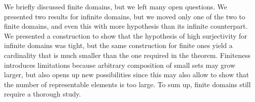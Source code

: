 We briefly discussed finite domains, but we left many open questions. We presented two results for infinite domains, but we moved only one of the two to finite domains, and even this with more hypothesis than its infinite counterpart. We presented a construction to show that the hypothesis of high surjectivity for infinite domains was tight, but the same construction for finite ones yield a cardinality that is much smaller than the one required in the theorem. Finiteness introduces limitations because arbitrary composition of small sets may grow larger, but also opens up new possibilities since this may also allow to show that the number of representable elements is too large.
To sum up, finite domains still require a thorough study.
